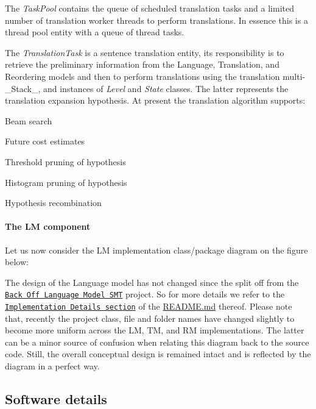 The {\itshape Task\+Pool} contains the queue of scheduled translation tasks and a limited number of translation worker threads to perform translations. In essence this is a thread pool entity with a queue of thread tasks.

The {\itshape Translation\+Task} is a sentence translation entity, its responsibility is to retrieve the preliminary information from the Language, Translation, and Reordering models and then to perform translations using the translation multi-\/\+\_\+\+Stack\+\_\+, and instances of {\itshape Level} and {\itshape State} classes. The latter represents the translation expansion hypothesis. At present the translation algorithm supports\+:


\begin{DoxyItemize}
\item Beam search
\item Future cost estimates
\item Threshold pruning of hypothesis
\item Histogram pruning of hypothesis
\item Hypothesis recombination
\end{DoxyItemize}

\paragraph*{The L\+M component}

Let us now consider the L\+M implementation class/package diagram on the figure below\+:



The design of the Language model has not changed since the split off from the \href{https://github.com/ivan-zapreev/Back-Off-Language-Model-SMT}{\tt Back Off Language Model S\+M\+T} project. So for more details we refer to the \href{https://github.com/ivan-zapreev/Back-Off-Language-Model-SMT/blob/master/README.md#implementation-details}{\tt Implementation Details section} of the \hyperlink{_r_e_a_d_m_e_8md}{R\+E\+A\+D\+M\+E.\+md} thereof. Please note that, recently the project class, file and folder names have changed slightly to become more uniform across the L\+M, T\+M, and R\+M implementations. The latter can be a minor source of confusion when relating this diagram back to the source code. Still, the overall conceptual design is remained intact and is reflected by the diagram in a perfect way.

\subsection*{Software details}

